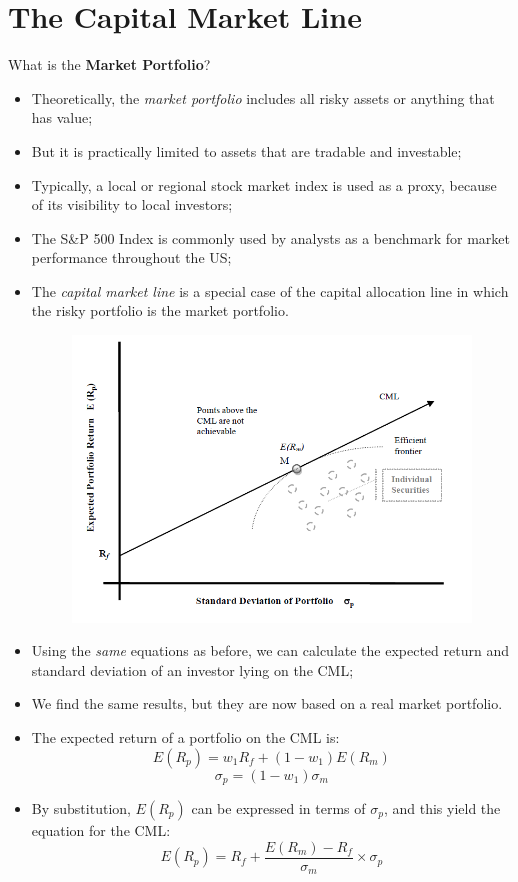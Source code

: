 \documentclass[11pt,a4paper]{report}
\begin{document}
\section{The Capital Market Line}
What is the \textbf{Market Portfolio}?
\begin{itemize}
    \item Theoretically, the \textit{market portfolio} includes all risky assets or anything that has value;
    \item But it is practically limited to assets that are tradable and investable;
    \item Typically, a local or regional stock market index is used as a proxy, because of its visibility to local investors;
    \item The S\&P 500 Index is commonly used by analysts as a benchmark for market performance throughout the US;
    \item The \textit{capital market line} is a special case of the capital allocation line in which the risky portfolio is the market portfolio.
    \begin{figure}[h]
        \centering
        \includegraphics[width=\textwidth]{images/CML.png}
    \end{figure}
    \item Using the \textit{same} equations as before, we can calculate the expected return and standard deviation of an investor lying on the CML;
    \item We find the same results, but they are now based on a real market portfolio.
    \item The expected return of a portfolio on the CML is:
    \[E(R_p) = w_1R_f + (1-w_1)E(R_m)\]
    \[\sigma_p = (1-w_1)\sigma_m\]
    \item By substitution, $E(R_p)$ can be expressed in terms of $\sigma_p$, and this yield the equation for the CML:
    \[E(R_p) = R_f + \frac{E(R_m)-R_f}{\sigma_m} \times \sigma_p\]
\end{itemize}
\end{document}

